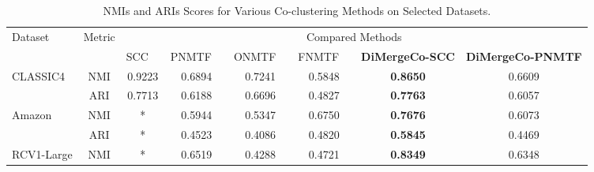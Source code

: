 \documentclass[journal]{IEEEtran}
\renewcommand{\cite}[1]{~\autocite{#1}}
\begin{document}
\begin{table}[htbp]
    \centering
    \caption{NMIs and ARIs Scores for Various Co-clustering Methods on Selected Datasets.}
    \label{tab:evaluation-metrics}
    \begin{tabular}{@{} l c cccccc @{}}
        \toprule
        \multirow{2}{*}{Dataset}    & \multirow{2}{*}{Metric} & \multicolumn{6}{c}{Compared Methods}                                                                                                                                                                                                                 \\
        \cmidrule{3-8}
                                    &                         & SCC~\cite{dhillon2001CoclusteringDocumentsWords} & PNMTF~\cite{chen2023ParallelNonNegativeMatrix} & ONMTF~\cite{ding2006OrthogonalNonnegativeMatrix} & FNMTF~\cite{kim2011FastNonnegativeMatrix} & \textbf{DiMergeCo-SCC} & \textbf{DiMergeCo-PNMTF} \\
        \midrule
        \multirow{2}{*}{CLASSIC4}   & NMI                     & 0.9223                                           & 0.6894                                         & 0.7241                                           & 0.5848                                    & \textbf{0.8650}        & 0.6609                   \\
                                    & ARI                     & 0.7713                                           & 0.6188                                         & 0.6696                                           & 0.4827                                    & \textbf{0.7763}        & 0.6057                   \\
        \multirow{2}{*}{Amazon}     & NMI                     & *                                                & 0.5944                                         & 0.5347                                           & 0.6750                                    & \textbf{0.7676}        & 0.6073                   \\
                                    & ARI                     & *                                                & 0.4523                                         & 0.4086                                           & 0.4820                                    & \textbf{0.5845}        & 0.4469                   \\
        \multirow{2}{*}{RCV1-Large} & NMI                     & *                                                & 0.6519                                         & 0.4288                                           & 0.4721                                    & \textbf{0.8349}        & 0.6348                   \\

\end{tabular}
\end{table}
\end{document}
